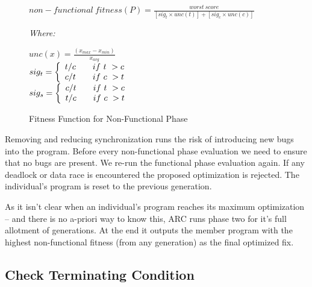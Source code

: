 \documentclass[10pt, conference, compsocconf]{IEEEtran}
\begin{document}
\begin{figure}
\begin{footnotesize}
\begin{center}
$non-functional\ fitness(P) = \frac{worst\ score}{[sig_t \times unc(t)] + [sig_c \times unc(c)]}$
\end{center}
\vspace{0.1cm} \textit{Where:} \vspace{0.1cm}
\end{footnotesize}
\begin{tiny}
\begin{center}
$unc(x) = \frac{(x_{max} - x_{min})}{x_{avg}}$ \\ \vspace{0.2cm}
$
  sig_t = \left\{
  \begin{array}{l l}
    t/c & \quad if\ t\ > c \\
    c/t & \quad if\ c\ > t \\
  \end{array} \right.
$ \\ \vspace{0.2cm}
$
  sig_s = \left\{
  \begin{array}{l l}
    c/t & \quad if\ t\ > c \\
    t/c & \quad if\ c\ > t \\
  \end{array} \right.
$ \\
\end{center}
\end{tiny}
\caption{Fitness Function for Non-Functional Phase}
\label{fig:nonfunctional_fitness}
\end{figure}

Removing and reducing synchronization runs the risk of introducing new bugs into the program. Before every non-functional phase evaluation we need to ensure that no bugs are present. We re-run the functional phase evaluation again. If any deadlock or data race is encountered the proposed optimization is rejected. The individual's program is reset to the previous generation.

As it isn't clear when an individual's program reaches its maximum optimization
-- and there is no a-priori way to know this, ARC runs phase two for
it's full allotment of generations.  At the end it outputs the member program
with the highest non-functional fitness (from any generation) as the final
optimized fix.

\subsection{Check Terminating Condition}
\label{sec:check_terminating_condition}
\end{document}

